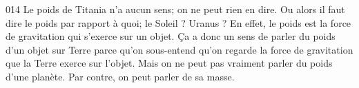 

\begin{corrige}{014}
Le poids de Titania n'a aucun sens; on ne peut rien en dire. Ou alors il faut dire le poids par rapport à quoi; le Soleil ? Uranus ? En effet, le poids est la force de gravitation qui s'exerce sur un objet. Ça a donc un sens de parler du poids d'un objet sur Terre parce qu'on sous-entend qu'on regarde la force de gravitation que la Terre exerce sur l'objet. Mais on ne peut pas vraiment parler du poids d'une planète. Par contre, on peut parler de sa masse.
\end{corrige}
